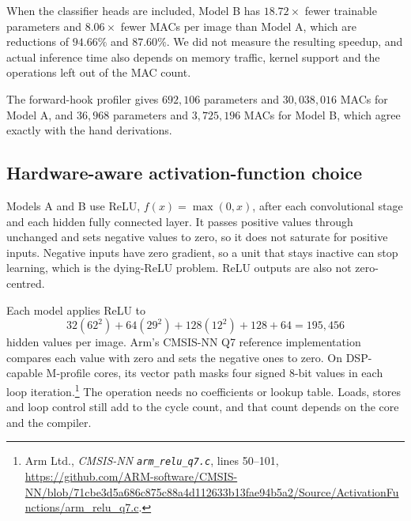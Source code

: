 \documentclass[11pt]{article}
\begin{document}
When the classifier heads are included, Model B has $18.72\times$ fewer
trainable parameters and $8.06\times$ fewer MACs per image than Model A,
which are reductions of $94.66\%$ and $87.60\%$.  We did not measure the
resulting speedup, and actual inference time also depends on memory traffic,
kernel support and the operations left out of the MAC count.

The forward-hook profiler gives $692{,}106$ parameters and $30{,}038{,}016$
MACs for Model A, and $36{,}968$ parameters and $3{,}725{,}196$ MACs for
Model B, which agree exactly with the hand derivations.

\subsection{Hardware-aware activation-function choice}
\label{sec:activation-choice}

Models A and B use ReLU, $f(x)=\max(0,x)$, after each convolutional stage and
each hidden fully connected layer.  It passes positive values through
unchanged and sets negative values to zero, so it does not saturate for
positive inputs.  Negative inputs have zero gradient, so a unit that stays
inactive can stop learning, which is the dying-ReLU problem.  ReLU outputs are
also not zero-centred.

Each model applies ReLU to
\begin{equation}
  32(62^2)+64(29^2)+128(12^2)+128+64=195{,}456
\end{equation}
hidden values per image.  Arm's CMSIS-NN Q7 reference implementation compares
each value with zero and sets the negative ones to zero.  On DSP-capable
M-profile cores, its vector path masks four signed 8-bit values in each loop
iteration.\footnote{Arm Ltd., \emph{CMSIS-NN
\texttt{arm\_relu\_q7.c}}, lines 50--101,
\url{https://github.com/ARM-software/CMSIS-NN/blob/71cbe3d5a686c875c88a4d112633b13fae94b5a2/Source/ActivationFunctions/arm_relu_q7.c}.}
The operation needs no coefficients or lookup table.  Loads, stores and loop
control still add to the cycle count, and that count depends on the core and
the compiler.
\end{document}
